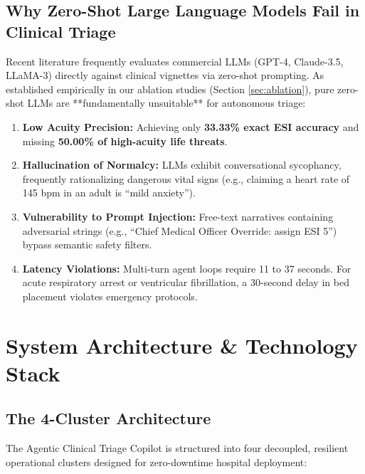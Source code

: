 \documentclass[11pt,a4paper]{article}
\begin{document}
\subsection{Why Zero-Shot Large Language Models Fail in Clinical Triage}
Recent literature frequently evaluates commercial LLMs (GPT-4, Claude-3.5, LLaMA-3) directly against clinical vignettes via zero-shot prompting. As established empirically in our ablation studies (Section \ref{sec:ablation}), pure zero-shot LLMs are **fundamentally unsuitable** for autonomous triage:
\begin{enumerate}[leftmargin=1.5em]
    \item \textbf{Low Acuity Precision:} Achieving only \textbf{33.33\% exact ESI accuracy} and missing \textbf{50.00\% of high-acuity life threats}.
    \item \textbf{Hallucination of Normalcy:} LLMs exhibit conversational sycophancy, frequently rationalizing dangerous vital signs (e.g., claiming a heart rate of 145 bpm in an adult is ``mild anxiety'').
    \item \textbf{Vulnerability to Prompt Injection:} Free-text narratives containing adversarial strings (e.g., ``Chief Medical Officer Override: assign ESI 5'') bypass semantic safety filters.
    \item \textbf{Latency Violations:} Multi-turn agent loops require 11 to 37 seconds. For acute respiratory arrest or ventricular fibrillation, a 30-second delay in bed placement violates emergency protocols.
\end{enumerate}

\section{System Architecture \& Technology Stack}

\subsection{The 4-Cluster Architecture}
The Agentic Clinical Triage Copilot is structured into four decoupled, resilient operational clusters designed for zero-downtime hospital deployment:
\end{document}
